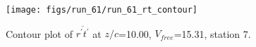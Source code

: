 \begin{figure}[H]
\centering
\texttt{[image: figs/run\_61/run\_61\_rt\_contour]}
\caption{Contour plot of $\overline{r^\prime t^\prime}$ at $z/c$=10.00, $V_{free}$=15.31, station 7.}
\end{figure}


